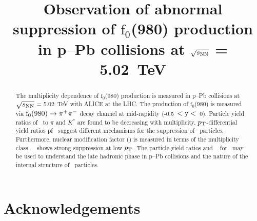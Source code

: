 \documentclass[ALICE,manyauthors]{cernphprep}
\begin{document}
\begin{titlepage}

\PHyear{}
\PHdate{\today}
%

\title{Observation of abnormal suppression of $\mathrm{f}_{0}$(980) production in p--Pb collisions at $\sqrt{s_{\rm NN}}$ = 5.02~TeV }

\ShortTitle{}   %


\begin{abstract}
The multiplicity dependence of $\mathrm{f}_{0}$(980) production is measured in p--Pb collisions at $\sqrt{s_{\rm NN}}$ = 5.02~TeV with ALICE at the LHC. The production of $\mathrm{f}_{0}$(980) is measured via $\mathrm{f}_{0}\rm{(980)} \rightarrow \pi^{+}\pi^{-}$ decay channel at mid-rapidity (-0.5~$<\rm{y}<$~0). Particle yield ratios of \fzero~to $\pi$ and $K^{*}$ are found to be decreasing with multiplicity. $p_{\rm{T}}$-differential yield ratios pf \fzero~suggest different mechanisms for the suppression of \fzero~particles. Furthermore, nuclear modification factor (\qppb) is  measured in terms of the multiplicity class. \qppb~ shows strong suppression at low $p_{\rm{T}}$. The particle yield ratios and \qppb~ for \fzero~may be used to understand the late hadronic phase in p--Pb collisions and the nature of the internal structure of \fzero~particles.



\color{black}

\end{abstract}

\end{titlepage}

\setcounter{page}{2}








\newenvironment{acknowledgement}{\relax}{\relax}
\begin{acknowledgement}
\section*{Acknowledgements}
\noindent 
\end{acknowledgement}

\newpage
\appendix



\clearpage




%     
\end{document}
